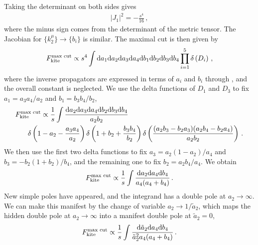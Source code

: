 Taking the determinant on both sides gives
\begin{align}
|J_1|^2 = - \frac{s^4}{16}\,,
\end{align}
where the minus sign comes from the determinant of the metric tensor. The Jacobian for  $\{k_2^{\mu}\} \to \{b_i\}$ is similar.
The maximal cut is then given by
\begin{align}
F_{\text{kite}}^{\text{max cut}} \propto s^4 \int \mathrm{d} a_1 \mathrm{d} a_2 \mathrm{d} a_3 \mathrm{d} a_4 \mathrm{d} b_1 \mathrm{d} b_2 \mathrm{d} b_3 \mathrm{d} b_4 \prod_{i=1}^5 \delta\left(D_i \right) \,,
\end{align}
where the inverse propagators are expressed in terms of $a_i$ and $b_i$ through , and the overall constant is neglected. We use the delta functions of $D_1$ and $D_3$ to fix $a_1=a_3 a_4/a_2$ and $b_1 = b_3 b_4/b_2$,
\begin{align} \begin{aligned}
& F_{\text{kite}}^{\text{max cut}} \propto \frac{1}{s} \int \frac{\d a_2 \d a_3 \d a_4 \d b_2 \d b_3 \d b_4}{a_2 b_2} \\
  & \phantom{I_{\text{kite}}} \delta\left(1-a_2 - \frac{a_3 a_4}{a_2} \right)  \delta\left(1+b_2 + \frac{b_3 b_4}{b_2} \right) 
   \delta\left( \frac{(a_2 b_3 - b_2 a_3) (a_2 b_4 - b_2 a_4)}{a_2 b_2}\right) \,.
\end{aligned}
\end{align}
We then use the first two delta functions to fix $a_3 = a_2(1-a_2)/a_4$ and $b_3 =-b_2(1+b_2)/b_4$, and the remaining one to fix $b_2 = a_2 b_4/a_4$. We obtain
\begin{align}
F_{\text{kite}}^{\text{max cut}} \propto \frac{1}{s} \int \frac{\mathrm{d} a_2 \mathrm{d} a_4 \mathrm{d} b_4}{a_4 (a_4+b_4)} \,.
\end{align}
New simple poles have appeared, and the integrand has a double pole at $a_2 \to \infty$. We can make this manifest by the change of variable $a_2 \to 1/\tilde{a}_2$, which maps the hidden double pole at $a_2 \to \infty$ into a manifest double pole at $\tilde{a}_2 = 0$,
\begin{align}
F_{\text{kite}}^{\text{max cut}} \propto \frac{1}{s} \int \frac{\mathrm{d} \tilde{a}_2 \mathrm{d} a_4 \mathrm{d} b_4}{\tilde{a}_2^2 a_4 (a_4+b_4)} \,.
\end{align}


